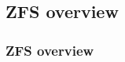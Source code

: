 \subsection{ZFS overview} %
\begin{frame}[fragile]
    \frametitle{ZFS overview}
\end{frame}
% 
% 
% 
% 
% 
% 
% 
% 
% 
% 
% 
% 
% 
% 
% 
% 
% 
% 
% 
